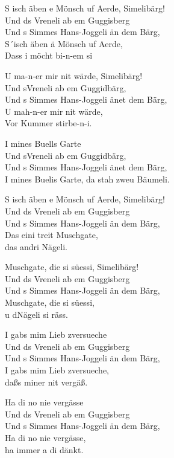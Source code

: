 \documentclass[
  letterpaper,
  twoside=false]{scrbook}
\begin{document}
S isch äben e Mönsch uf Aerde, Simelibärg!\\
Und ds Vreneli ab em Guggisberg\\
Und s Simmes Hans-Joggeli än dem Bärg,\\
S´isch äben ä Mönsch uf Aerde,\\
Dass i möcht bi-n-em si

U ma-n-er mir nit wärde, Simelibärg!\\
Und s\textquotesingle Vreneli ab em Guggidbärg,\\
Und s\textquotesingle{} Simmes Hans-Joggeli änet dem Bärg,\\
U mah-n-er mir nit wärde,\\
Vor Kummer stirbe-n-i.

I mines Buells Garte\\
Und s\textquotesingle Vreneli ab em Guggidbärg,\\
Und s\textquotesingle{} Simmes Hans-Joggeli änet dem Bärg,\\
I mines Buelis Garte, da stah zweu Bäumeli.

S isch äben e Mönsch uf Aerde, Simelibärg!\\
Und ds Vreneli ab em Guggisberg\\
Und s Simmes Hans-Joggeli än dem Bärg,\\
Das eini treit Muschgate,\\
das andri Nägeli.

Muschgate, die si süessi, Simelibärg!\\
Und ds Vreneli ab em Guggisberg\\
Und s Simmes Hans-Joggeli än dem Bärg,\\
Muschgate, die si süessi,\\
u d\textquotesingle Nägeli si räss.

I gabs mim Lieb z\textquotesingle versueche\\
Und ds Vreneli ab em Guggisberg\\
Und s Simmes Hans-Joggeli än dem Bärg,\\
I gabs mim Lieb z\textquotesingle versueche,\\
daßs miner nit vergäß.

Ha di no nie vergässe\\
Und ds Vreneli ab em Guggisberg\\
Und s Simmes Hans-Joggeli än dem Bärg,\\
Ha di no nie vergässe,\\
ha immer a di dänkt.
\end{document}
